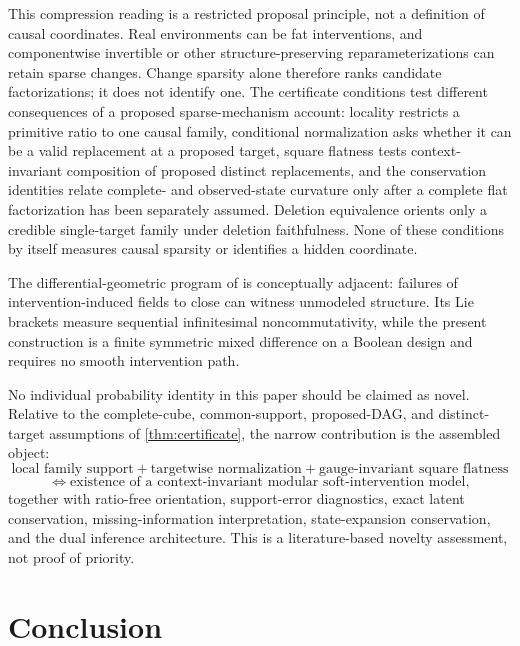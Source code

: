 \documentclass[11pt]{article}
\begin{document}
This compression reading is a restricted proposal principle, not a definition
of causal coordinates.  Real environments can be fat interventions, and
componentwise invertible or other structure-preserving reparameterizations can
retain sparse changes.  Change sparsity alone therefore ranks candidate
factorizations; it does not identify one.  The certificate conditions test
different consequences of a proposed sparse-mechanism account: locality
restricts a primitive ratio to one causal family, conditional normalization
asks whether it can be a valid replacement at a proposed target, square
flatness tests context-invariant composition of proposed distinct
replacements, and the conservation identities relate complete- and
observed-state curvature only after a complete flat factorization has been
separately assumed.  Deletion equivalence orients only a credible single-target
family under deletion faithfulness.  None of these conditions by itself
measures causal sparsity or identifies a hidden coordinate.

The differential-geometric program of \citet{mahadevan2026infinitesimal} is conceptually adjacent: failures of intervention-induced fields to close can witness unmodeled structure.  Its Lie brackets measure sequential infinitesimal noncommutativity, while the present construction is a finite symmetric mixed difference on a Boolean design and requires no smooth intervention path.

No individual probability identity in this paper should be claimed as novel.  Relative to the complete-cube, common-support, proposed-DAG, and distinct-target assumptions of \cref{thm:certificate}, the narrow contribution is the assembled object:
\begin{equation}
\boxed{
\text{local family support}
+
\text{targetwise normalization}
+
\text{gauge-invariant square flatness}
}
\end{equation}
\begin{equation}
\boxed{
\Longleftrightarrow
\text{existence of a context-invariant modular soft-intervention model},
}
\end{equation}
together with ratio-free orientation, support-error diagnostics, exact latent conservation, missing-information interpretation, state-expansion conservation, and the dual inference architecture.  This is a literature-based novelty assessment, not proof of priority.

\section{Conclusion}
\end{document}
